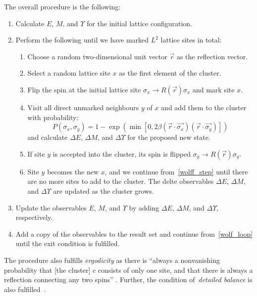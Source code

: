 		The overall procedure is the following:
		\begin{enumerate}
			\item Calculate $E$, $M$, and $\Upsilon$ for the initial lattice configuration.
			\item \label{wolf_loop} Perform the following until we have marked $L^2$ lattice sites in total:
			\begin{enumerate}
				\item Choose a random two-dimensional unit vector $\vec{r}$ as the reflection vector.
				\item Select a random lattice site $x$ as the first element of the cluster.
				\item Flip the spin at the initial lattice site $\sigma_x \rightarrow R(\vec{r}) \sigma_x$ and mark site $x$.
				\item \label{wolff_step} Visit all direct unmarked neighbours $y$ of $x$ and add them to the cluster with probability:
					\begin{equation}\label{eq:wolff}
						P(\sigma_x, \sigma_y) = 1 - \exp(\min[0, 2 \beta (\vec{r}\cdot\vec{\sigma_x}) (\vec{r}\cdot\vec{\sigma_y})])
					\end{equation}
					and calculate $\Delta E$, $\Delta M$, and $\Delta \Upsilon$ for the proposed new state.
				\item If site $y$ is accepted into the cluster, its spin is flipped $\sigma_y \rightarrow R(\vec{r}) \sigma_y$.
				\item Site $y$ becomes the new $x$, and we continue from~\cref{wolff_step} until there are no more sites to add to the cluster. The delte observables $\Delta E$, $\Delta M$, and $\Delta \Upsilon$ are updated as the cluster grows.
			\end{enumerate}
			\item Update the observables $E$, $M$, and $\Upsilon$ by adding $\Delta E$, $\Delta M$, and $\Delta \Upsilon$, respectively.
			\item Add a copy of the observables to the result set and continue from~\cref{wolf_loop} until the exit condition is fulfilled.
		\end{enumerate}
		The procedure also fulfills \emph{ergodicity} as there is \enquote{always a nonvanishing probability that [the cluster] $c$ consists of only one site, and that there is always a reflection connecting any two spins} \citep[p. 361]{wolff}.  Further, the condition of~\emph{detailed balance} is also fulfilled~\cite[eq. 6]{wolff}.
	
